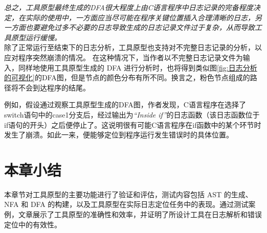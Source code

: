 \emph{总之，工具原型最终生成的DFA很大程度上由C语言程序中日志记录的完备程度决定，在实际的使用中，一方面应当尽可能在程序关键位置插入合理清晰的日志，另一方面也要避免过多不必要的日志导致生成的日志记录文件过于复杂，从而导致工具原型运行缓慢。}\\

除了正常运行至结束下的日志分析，工具原型也支持对不完整日志记录的分析，以应对程序突然崩溃的情况。
在这种情况下，当作者以不完整日志记录文件为输入，同样地使用工具原型生成的 DFA 进行分析时，也将得到类似图\ref{fig:日志分析的可视化}的DFA图，但是节点的颜色分布有所不同。换言之，粉色节点组成的路径将不会到达程序的结尾。

例如，假设通过观察工具原型生成的DFA图，作者发现，C语言程序在选择了switch语句中的case1分支后，经过输出为\emph{“Inside if”}的日志函数（该日志函数位于if语句的开头）之后便停止了。这说明很有可能C语言程序在if函数中的某个环节时发生了崩溃。如此一来，便能够定位到程序运行发生错误时的具体位置。

\section{本章小结}
本章节对工具原型的主要功能进行了验证和评估，测试内容包括 AST 的生成、NFA 和 DFA 的构建，以及工具原型在实际日志定位任务中的表现。通过测试案例，文章展示了工具原型的准确性和效率，并证明了所设计工具在日志解析和错误定位中的有效性。


